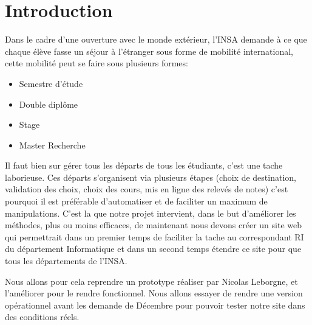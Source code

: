 \chapter*{Introduction}
Dans le cadre d’une ouverture avec le monde extérieur, l’INSA demande à ce que chaque élève fasse un séjour à l’étranger sous forme de mobilité international, cette mobilité peut se faire sous plusieurs formes:
\begin{itemize}
\item Semestre d’étude
\item Double diplôme
\item Stage
\item Master Recherche
\end{itemize}

Il faut bien sur gérer tous les départs de tous les étudiants, c’est une tache laborieuse.
Ces départs s’organisent via plusieurs étapes (choix de destination, validation des choix, choix des cours, mis en ligne des relevés de notes) c’est pourquoi il est préférable d’automatiser et de faciliter un maximum de manipulations.
C’est la que notre projet intervient, dans le but d’améliorer les méthodes, plus ou moins efficaces, de maintenant nous devons créer un site web qui permettrait dans un premier temps de faciliter la tache au correspondant RI du département Informatique et dans un second temps étendre ce site pour que tous les départements de l’INSA.

Nous allons pour cela reprendre un prototype réaliser par Nicolas Leborgne, et l’améliorer pour le rendre fonctionnel.
Nous allons essayer de rendre une version opérationnel avant les demande de Décembre pour pouvoir tester notre site dans des conditions réels.

